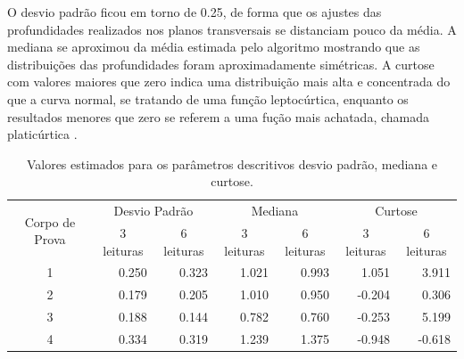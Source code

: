 O desvio padrão ficou em torno de 0.25, de forma que os ajustes das profundidades realizados nos planos transversais se distanciam pouco da média. A mediana se aproximou da média estimada pelo algoritmo mostrando que as distribuições das profundidades foram aproximadamente simétricas. A curtose com valores maiores que zero indica uma distribuição mais alta e concentrada do que a curva normal, se tratando de uma função leptocúrtica, enquanto os resultados menores que zero se referem a uma fução mais achatada, chamada platicúrtica \cite{magalhaes}.

\begin{table}[htb!]
\centering
\caption{Valores estimados para os parâmetros descritivos desvio padrão, mediana e curtose.}
\label{tab:parametrosDescritivos}
\begin{tabular}{crrrrrr}
\hline
\multirow{2}{*}{Corpo de Prova} & \multicolumn{2}{c}{Desvio Padrão}                               & \multicolumn{2}{c}{Mediana}                                     & \multicolumn{2}{c}{Curtose}                                     \\ \cline{2-7} 
                                & \multicolumn{1}{c}{3 leituras} & \multicolumn{1}{c}{6 leituras} & \multicolumn{1}{c}{3 leituras} & \multicolumn{1}{c}{6 leituras} & \multicolumn{1}{c}{3 leituras} & \multicolumn{1}{c}{6 leituras} \\ \hline
1                               & 0.250                          & 0.323                          & 1.021                          & 0.993                          & 1.051                          & 3.911                          \\
2                               & 0.179                          & 0.205                          & 1.010                           & 0.950                          & -0.204                         & 0.306                          \\
3                               & 0.188                          & 0.144                          & 0.782                          & 0.760                          & -0.253                         & 5.199                          \\
4                               & 0.334                          & 0.319                          & 1.239                          & 1.375                          & -0.948                         & -0.618                         \\ \hline
\end{tabular}
\end{table}

